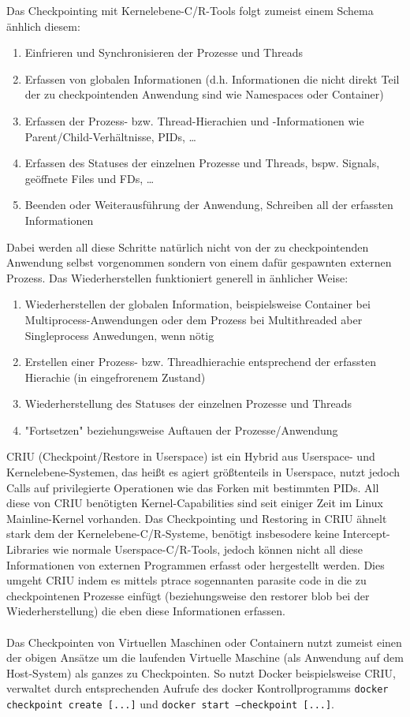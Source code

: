 \documentclass[12pt]{scrartcl}
\begin{document}
Das Checkpointing mit Kernelebene-C/R-Tools folgt zumeist einem Schema änhlich diesem:
\begin{enumerate}
    \item Einfrieren und Synchronisieren der Prozesse und Threads
    \item Erfassen von globalen Informationen (d.h. Informationen die nicht direkt Teil der zu checkpointenden Anwendung sind wie Namespaces oder Container)
    \item Erfassen der Prozess- bzw. Thread-Hierachien und -Informationen wie Parent/Child-Verhältnisse, PIDs, \dots
    \item Erfassen des Statuses der einzelnen Prozesse und Threads, bspw. Signals, geöffnete Files und FDs, \dots
    \item Beenden oder Weiterausführung der Anwendung, Schreiben all der erfassten Informationen
\end{enumerate}
Dabei werden all diese Schritte natürlich nicht von der zu checkpointenden Anwendung selbst vorgenommen sondern von einem dafür gespawnten externen Prozess. Das Wiederherstellen funktioniert generell in änhlicher Weise:
\begin{enumerate}
    \item Wiederherstellen der globalen Information, beispielsweise Container bei Multiprocess-Anwendungen oder dem Prozess bei Multithreaded aber Singleprocess Anwedungen, wenn nötig
    \item Erstellen einer Prozess- bzw. Threadhierachie entsprechend der erfassten Hierachie (in eingefrorenem Zustand)
    \item Wiederherstellung des Statuses der einzelnen Prozesse und Threads
    \item "Fortsetzen" beziehungsweise Auftauen der Prozesse/Anwendung
\end{enumerate}
CRIU (Checkpoint/Restore in Userspace) ist ein Hybrid aus Userspace- und Kernelebene-Systemen, das heißt es agiert größtenteils in Userspace, nutzt jedoch Calls auf privilegierte Operationen wie das Forken mit bestimmten PIDs. All diese von CRIU benötigten Kernel-Capabilities sind seit einiger Zeit im Linux Mainline-Kernel vorhanden.
Das Checkpointing und Restoring in CRIU ähnelt stark dem der Kernelebene-C/R-Systeme, benötigt insbesodere keine Intercept-Libraries wie normale Userspace-C/R-Tools, jedoch können nicht all diese Informationen von externen Programmen erfasst oder hergestellt werden. Dies umgeht CRIU indem es mittels ptrace sogennanten parasite code in die zu checkpointenen Prozesse einfügt (beziehungsweise den restorer blob bei der Wiederherstellung) die eben diese Informationen erfassen.\\ \\
Das Checkpointen von Virtuellen Maschinen oder Containern nutzt zumeist einen der obigen Ansätze um die laufenden Virtuelle Maschine (als Anwendung auf dem Host-System) als ganzes zu Checkpointen. So nutzt Docker beispielsweise CRIU, verwaltet durch entsprechenden Aufrufe des docker Kontrollprogramms \texttt{docker checkpoint create [...]} und \texttt{docker start --checkpoint [...]}.
\end{document}
